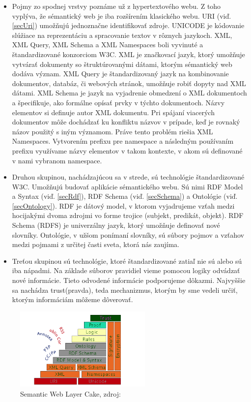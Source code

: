 \begin{itemize}
\item Pojmy zo spodnej vrstvy poznáme už z hypertextového webu. Z toho vyplýva, že sémantický web je iba rozšírením klasického webu. URI (viď. \ref{secUri}) umožňujú jednoznačne identifikovať zdroje. UNICODE je kódovanie slúžiace na reprezentáciu a spracovanie textov v rôznych jazykoch. XML, XML Query, XML Schema a XML Namespaces boli vyvinuté a štandardizované konzorciom W3C. XML je značkovací jazyk, ktorý umožňuje vytvárať dokumenty so štruktúrovanými dátami, ktorým sémantický web dodáva význam.
XML Query je štandardizovaný jazyk na kombinovanie dokumentov, databáz, či webových stránok, umožňuje robiť dopyty nad XML dátami. XML Schema je jazyk na vyjadrenie obmedzení o XML dokumentoch a špecifikuje, ako formálne opísať prvky v týchto dokumentoch. Názvy elementov si definuje autor XML dokumentu. Pri spájaní viacerých dokumentov môže dochádzať ku konfliktu názvov v prípade, keď je rovnaký názov použitý s iným významom. Práve tento problém riešia XML Namespaces. Vytvorením prefixu pre namespace a následným používaním prefixu využívame názvy elementov v takom kontexte, v akom sú definované v nami vybranom namespace. 

\item Druhou skupinou, nachádzajúcou sa v strede, sú technológie štandardizované W3C. Umožňujú budovať aplikácie sémantického webu. Sú nimi RDF Model a Syntax (viď. \ref{secRdf}), RDF Schema (viď. \ref{secSchema}) a Ontológie (viď. \ref{secOntology}). RDF je dátový model, v ktorom vyjadrujeme vzťah medzi hocijakými dvoma zdrojmi vo forme trojice (subjekt, predikát, objekt). RDF Schema (RDFS) je univerzálny jazyk, ktorý umožňuje definovať nové slovníky. Ontológie, v užšom ponímaní slovníky, sú súbory pojmov a vzťahov medzi pojmami z určitej časti sveta, ktorá nás zaujíma.

\item Treťou skupinou sú technológie, ktoré štandardizované zatiaľ nie sú alebo sú iba nápadmi. Na základe súborov pravidiel vieme pomocou logiky odvádzať nové informácie. Tieto odvodené informácie podporujeme dôkazmi. Najvyššie sa nachádza trust(pravda), teda mechanizmus, ktorým by sme vedeli určiť, ktorým informáciám môžeme dôverovať. 
\end{itemize}

\begin{figure}[h]
\centering
\includegraphics[width=0.6\textwidth]{images/semanticLayerCake}
\caption{Semantic Web Layer Cake, zdroj: \cite{semanticWebLayer}}
\label{semanticLayerCake}
\end{figure}

